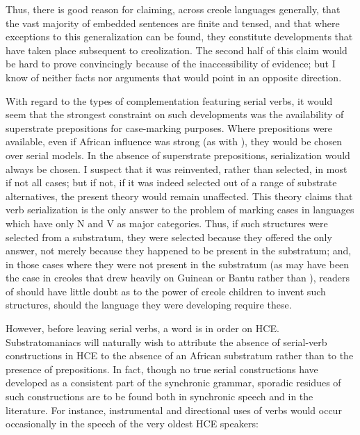 Thus, there is good reason for claiming, across creole languages generally, that the vast majority of embedded sentences are finite and tensed, and that where exceptions to this generalization can be found, they constitute developments that have taken place subsequent to creolization. The second half of this claim would be hard to prove convincingly because of the inaccessibility of evidence; but I know of neither facts nor arguments that would point in an opposite direction.

With regard to the types of complementation featuring serial verbs, it would seem that the strongest constraint on such developments was the availability of superstrate prepositions for case-marking purposes. Where prepositions were available, even if African influence was strong (as with ), they would be chosen over serial models. In the absence of superstrate prepositions, serialization would always be chosen. I suspect that it was reinvented, rather than selected,
in most if not all cases; but if not, if it was indeed selected out of a range of substrate alternatives, the present theory would remain unaffected. This theory claims that verb serialization is the only answer to the problem of marking cases in languages which have only N and V as major categories. Thus, if such structures were selected from a substratum, they were selected because they offered the only answer, not merely because they happened to be present in the substratum; and, in those cases where they were not present in the substratum (as may have been the case in creoles that drew heavily on Guinean or Bantu rather than ), readers of  should have little doubt as to the power of creole children to invent such structures, should the language they were developing require these.

However, before leaving serial verbs, a word is in order on HCE. Substratomaniacs will naturally wish to attribute the absence of serial-verb constructions in HCE to the absence of an African substratum rather than to the presence of prepositions. In fact, though no true serial constructions have developed as a consistent part of the synchronic grammar, sporadic residues of such constructions are to be found both in synchronic speech and in the literature. For instance, instrumental and directional uses of verbs would occur occasionally in the speech of the very oldest HCE speakers:

